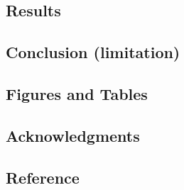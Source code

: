 \documentclass[
]{article}
\begin{document}
\hypertarget{results}{%
\subsection{Results}\label{results}}

\hypertarget{conclusion-limitation}{%
\subsection{Conclusion (limitation)}\label{conclusion-limitation}}

\hypertarget{figures-and-tables}{%
\subsection{Figures and Tables}\label{figures-and-tables}}

\hypertarget{acknowledgments}{%
\subsection{Acknowledgments}\label{acknowledgments}}

\hypertarget{reference}{%
\subsection{Reference}\label{reference}}
\end{document}
